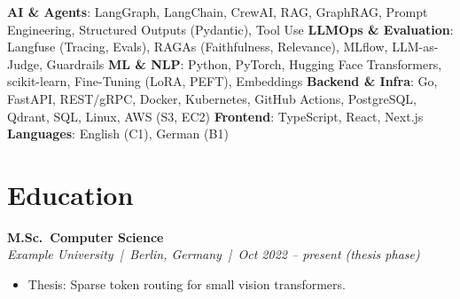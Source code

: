 \documentclass[a4paper,10pt]{article}
\newcommand{\skillcat}[2]{{\color{accent}\textbf{#1}}: #2}
\newcommand{\edutitle}[4]{\textbf{#1} \\ {\small\color{graytext}\textit{#2 \,|\, #3 \,|\, #4}}\vspace{1pt}}
\begin{document}
\skillcat{AI \& Agents}{LangGraph, LangChain, CrewAI, RAG, GraphRAG, Prompt Engineering, Structured Outputs (Pydantic), Tool Use}
\skillcat{LLMOps \& Evaluation}{Langfuse (Tracing, Evals), RAGAs (Faithfulness, Relevance), MLflow, LLM-as-Judge, Guardrails}
\skillcat{ML \& NLP}{Python, PyTorch, Hugging Face Transformers, scikit-learn, Fine-Tuning (LoRA, PEFT), Embeddings}
\skillcat{Backend \& Infra}{Go, FastAPI, REST/gRPC, Docker, Kubernetes, GitHub Actions, PostgreSQL, Qdrant, SQL, Linux, AWS (S3, EC2)}
\skillcat{Frontend}{TypeScript, React, Next.js}
\skillcat{Languages}{English (C1), German (B1)}

\section{Education}

\edutitle{M.Sc.\ Computer Science}{Example University}{Berlin, Germany}{Oct 2022 -- present (thesis phase)}
\begin{itemize}
  \item Thesis: Sparse token routing for small vision transformers.
\end{itemize}
\end{document}
